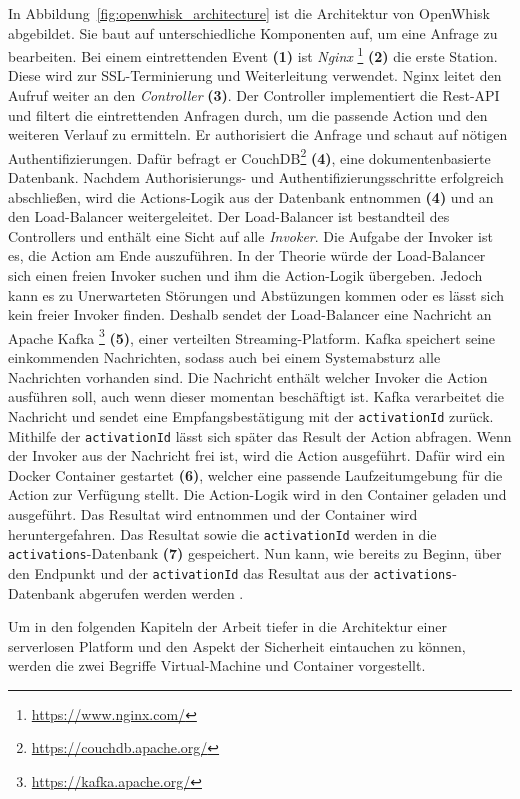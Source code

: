In Abbildung~\ref{fig:openwhisk_architecture} ist die Architektur von
OpenWhisk abgebildet. Sie baut auf unterschiedliche Komponenten auf,
um eine Anfrage zu bearbeiten. Bei einem eintrettenden Event \textbf{(1)}
ist \emph{Nginx} \footnote{\url{https://www.nginx.com/}} \textbf{(2)} die erste
Station. Diese wird zur SSL-Terminierung und Weiterleitung verwendet.
Nginx leitet den Aufruf weiter an den \emph{Controller} \textbf{(3)}.
Der Controller implementiert die Rest-API und filtert die
eintrettenden Anfragen durch, um die passende Action und
den weiteren Verlauf zu ermitteln.
Er authorisiert die Anfrage und schaut auf nötigen Authentifizierungen.
Dafür befragt er CouchDB\footnote{\url{https://couchdb.apache.org/}}
\textbf{(4)},
eine dokumentenbasierte Datenbank. Nachdem Authorisierungs-
und Authentifizierungsschritte erfolgreich abschließen,
wird die Actions-Logik aus der Datenbank entnommen \textbf{(4)} und an den
Load-Balancer weitergeleitet. Der Load-Balancer ist bestandteil
des Controllers und enthält eine Sicht auf alle \emph{Invoker}.
Die Aufgabe der Invoker ist es, die Action am Ende auszuführen.
In der Theorie würde der Load-Balancer sich einen freien Invoker suchen
und ihm die Action-Logik übergeben. Jedoch kann es zu Unerwarteten
Störungen und Abstüzungen kommen oder es lässt sich kein freier
Invoker finden. Deshalb sendet der Load-Balancer eine Nachricht an
Apache Kafka \footnote{\url{https://kafka.apache.org/}} \textbf{(5)},
einer verteilten Streaming-Platform. Kafka speichert seine
einkommenden Nachrichten, sodass auch bei einem Systemabsturz alle
Nachrichten vorhanden sind. Die Nachricht enthält welcher
Invoker die Action ausführen soll, auch wenn dieser momentan
beschäftigt ist. Kafka verarbeitet die Nachricht und sendet eine
Empfangsbestätigung mit der \texttt{activationId} zurück. Mithilfe
der \texttt{activationId} lässt sich später das Result der Action
abfragen. Wenn der Invoker aus der Nachricht frei ist, wird die
Action ausgeführt. Dafür wird ein Docker Container gestartet \textbf{(6)},
welcher eine passende Laufzeitumgebung für die Action zur Verfügung
stellt. Die Action-Logik wird in den Container geladen und ausgeführt.
Das Resultat wird entnommen und der Container wird heruntergefahren.
Das Resultat sowie die \texttt{activationId} werden in die
\texttt{activations}-Datenbank \textbf{(7)} gespeichert. Nun kann, wie bereits zu Beginn,
über den Endpunkt und der \texttt{activationId} das Resultat aus
der \texttt{activations}-Datenbank abgerufen werden werden
\cite{OpenWhiskGithub}.

Um in den folgenden Kapiteln der Arbeit tiefer in die Architektur einer
serverlosen Platform und den Aspekt der Sicherheit eintauchen zu können,
werden die zwei Begriffe Virtual-Machine und Container vorgestellt.

